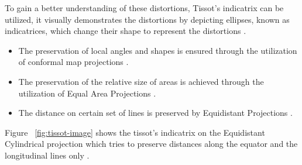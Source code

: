 To gain a better understanding of these distortions, Tissot's indicatrix can be utilized, it visually demonstrates the distortions by depicting ellipses, known as indicatrices, which change their shape to represent the distortions \cite{Snyder1982}.
\begin{itemize}
    \item The preservation of local angles and shapes is ensured through the utilization of conformal map projections \cite{GISGEO_Tissot}.
    \item The preservation of the relative size of areas is achieved through the utilization of Equal Area Projections \cite{GISGEO_Tissot}.
    \item The distance on certain set of lines is preserved by Equidistant Projections \cite{GISGEO_Tissot}.
\end{itemize}
Figure ~\ref{fig:tissot-image} shows the tissot's indicatrix on the Equidistant Cylindrical projection which tries to preserve distances along the equator and the longitudinal lines only \cite{GISGEO_Tissot}.